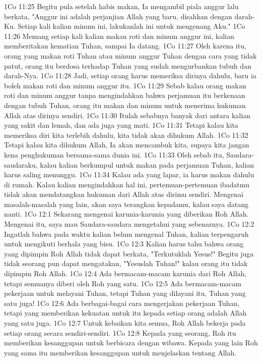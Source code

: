 1Co 11:25  Begitu pula setelah habis makan, Ia mengambil piala anggur lalu berkata, "Anggur ini adalah perjanjian Allah yang baru, disahkan dengan darah-Ku. Setiap kali kalian minum ini, lakukanlah ini untuk mengenang Aku."
1Co 11:26  Memang setiap kali kalian makan roti dan minum anggur ini, kalian memberitakan kematian Tuhan, sampai Ia datang.
1Co 11:27  Oleh karena itu, orang yang makan roti Tuhan atau minum anggur Tuhan dengan cara yang tidak patut, orang itu berdosa terhadap Tuhan yang sudah mengurbankan tubuh dan darah-Nya.
1Co 11:28  Jadi, setiap orang harus memeriksa dirinya dahulu, baru ia boleh makan roti dan minum anggur itu.
1Co 11:29  Sebab kalau orang makan roti dan minum anggur tanpa mengindahkan bahwa perjamuan itu berkenaan dengan tubuh Tuhan, orang itu makan dan minum untuk menerima hukuman Allah atas dirinya sendiri.
1Co 11:30  Itulah sebabnya banyak dari antara kalian yang sakit dan lemah, dan ada juga yang mati.
1Co 11:31  Tetapi kalau kita memeriksa diri kita terlebih dahulu, kita tidak akan dihukum Allah.
1Co 11:32  Tetapi kalau kita dihukum Allah, Ia akan mencambuk kita, supaya kita jangan kena penghukuman bersama-sama dunia ini.
1Co 11:33  Oleh sebab itu, Saudara-saudaraku, kalau kalian berkumpul untuk makan pada perjamuan Tuhan, kalian harus saling menunggu.
1Co 11:34  Kalau ada yang lapar, ia harus makan dahulu di rumah. Kalau kalian mengindahkan hal ini, pertemuan-pertemuan ibadatmu tidak akan mendatangkan hukuman dari Allah atas dirimu sendiri. Mengenai masalah-masalah yang lain, akan saya terangkan kepadamu, kalau saya datang nanti.
1Co 12:1  Sekarang mengenai karunia-karunia yang diberikan Roh Allah. Mengenai itu, saya mau Saudara-saudara mengetahui yang sebenarnya.
1Co 12:2  Ingatlah bahwa pada waktu kalian belum mengenal Tuhan, kalian terpengaruh untuk mengikuti berhala yang bisu.
1Co 12:3  Kalian harus tahu bahwa orang yang dipimpin Roh Allah tidak dapat berkata, "Terkutuklah Yesus!" Begitu juga tidak seorang pun dapat mengatakan, "Yesuslah Tuhan!" kalau orang itu tidak dipimpin Roh Allah.
1Co 12:4  Ada bermacam-macam karunia dari Roh Allah, tetapi semuanya diberi oleh Roh yang satu.
1Co 12:5  Ada bermacam-macam pekerjaan untuk melayani Tuhan, tetapi Tuhan yang dilayani itu, Tuhan yang satu juga!
1Co 12:6  Ada berbagai-bagai cara mengerjakan pekerjaan Tuhan, tetapi yang memberikan kekuatan untuk itu kepada setiap orang adalah Allah yang satu juga.
1Co 12:7  Untuk kebaikan kita semua, Roh Allah bekerja pada setiap orang secara sendiri-sendiri.
1Co 12:8  Kepada yang seorang, Roh itu memberikan kesanggupan untuk berbicara dengan wibawa. Kepada yang lain Roh yang sama itu memberikan kesanggupan untuk menjelaskan tentang Allah.
